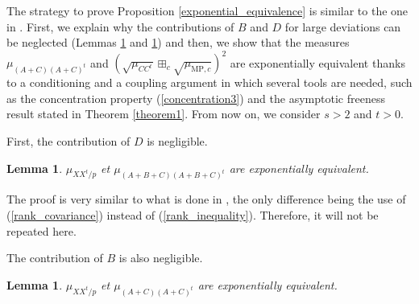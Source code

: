 \documentclass[11pt,a4paper]{article}
\DeclareMathOperator{\1}{\mathbf{1}}
\newcommand{\mump}{\mu_{\mathrm{MP},c}}
\newtheorem{Lemma}[Proposition]{Lemma}
\theoremstyle{definition}
\begin{document}
The strategy to prove Proposition \ref{exponential_equivalence} is similar to the one in \cite{BC}. First, we explain why the contributions of $B$ and $D$ for large deviations can be neglected (Lemmas \ref{exp_equiv_lemma1} and \ref{exp_equiv_lemma2}) and then, we show that the measures $\mu_{(A+C)(A+C)^t}$ and $\left( \sqrt{\mu_{CC^t}} \boxplus_c \sqrt{\mump} \right)^2$ are exponentially equivalent thanks to a conditioning and a coupling argument in which several tools are needed, such as the concentration property (\ref{concentration3}) and the asymptotic freeness result stated in Theorem \ref{theorem1}. From now on, we consider $s>2$ and $t>0$.

First, the contribution of $D$ is negligible.

\begin{Lemma} \label{exp_equiv_lemma1}
$\mu_{XX^t/p}$ et $\mu_{(A+B+C)(A+B+C)^t}$ are exponentially equivalent.
\end{Lemma}

The proof is very similar to what is done in \cite{BC}, the only difference being the use of (\ref{rank_covariance}) instead of (\ref{rank_inequality}). Therefore, it will not be repeated here.

The contribution of $B$ is also negligible.

\begin{Lemma} \label{exp_equiv_lemma2}
$\mu_{XX^t/p}$ et $\mu_{(A+C)(A+C)^t}$ are exponentially equivalent.
\end{Lemma}
\end{document}
